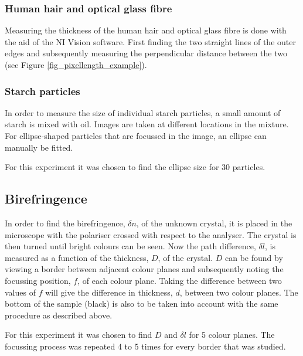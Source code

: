 \subsubsection{Human hair and optical glass fibre}

Measuring the thickness of the human hair and optical glass fibre is done with the aid of the NI Vision software. First finding the two straight lines of the outer edges and subsequently measuring the perpendicular distance between the two (see Figure \ref{fig_pixellength_example}). 

\subsubsection{Starch particles}

In order to measure the size of individual starch particles, a small amount of starch is mixed with oil. Images are taken at different locations in the mixture. For ellipse-shaped particles that are focussed in the image, an ellipse can manually be fitted.

For this experiment it was chosen to find the ellipse size for 30 particles.


\subsection{Birefringence}

In order to find the birefringence, $\delta n$, of the unknown crystal, it is placed in the microscope with the polariser crossed with respect to the analyser. The crystal is then turned until bright colours can be seen. Now the path difference, $\delta l$, is measured as a function of the thickness, $D$, of the crystal. $D$ can be found by viewing a border between adjacent colour planes and subsequently noting the focussing position, $f$, of each colour plane. Taking the difference between two values of $f$ will give the difference in thickness, $d$, between two colour planes. The bottom of the sample (black) is also to be taken into account with the same procedure as described above. 

For this experiment it was chosen to find $D$ and $\delta l$ for 5 colour planes. The focussing process was repeated 4 to 5 times for every border that was studied.










\begin{comment}
The Experimentele opstelling or Experimentele  methode (Experimental  set  up  or  Experimental method) chapter describes the experimental setup and the experimental methods used in sufficient detail such that a reader can judge the soundness and, in principle, may verify the conclusions of your research. Also,  this  chapter  should  be  informative  for  a  reader  who  wants  to  perform  similar  research.  Preferably  use clear sketches of the setup, rather than photographs. In this chapter you also describe the accuracywith which direct observables have been measured, and the accuracy of the important deduced quantities. Detailed accuracy calculations should be put in an Appendix
\end{comment}
